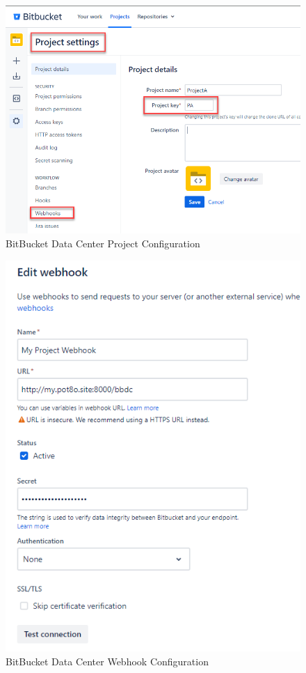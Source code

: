 \begin{figure}[ht]
    \includegraphics[width=\textwidth]{graphics/bbdc-project-config.png}
    \caption{BitBucket Data Center Project Configuration}
    \label{fig:bbdc-project-config}
\end{figure}

\begin{figure}[ht]
    \includegraphics[width=\textwidth]{graphics/bbdc-webhook-config.png}
    \caption{BitBucket Data Center Webhook Configuration}
    \label{fig:bbdc-webhook-config}
\end{figure}



